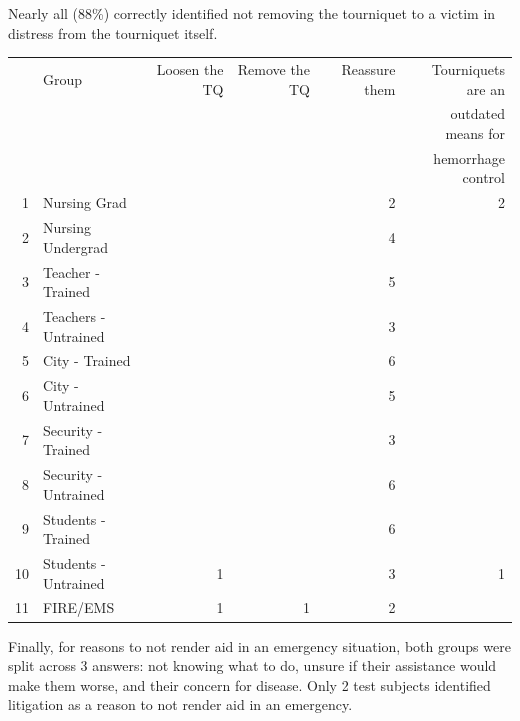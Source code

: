 \documentclass{article}
\begin{document}
Nearly all (88\%) correctly identified not removing the tourniquet to a victim in distress
from the tourniquet itself. 

\begin{table}[ht]
\centering
\begin{tabular}{rlrrrr}
  \hline
 & Group & Loosen the TQ & Remove the TQ & Reassure them & Tourniquets are an \\
 &  &  &  &  & outdated means for \\
 &  &  &  &  & hemorrhage control \\
  \hline
1 & Nursing Grad &  &  &   2 &   2 \\
  2 & Nursing Undergrad &  &  &   4 &  \\
  3 & Teacher - Trained &  &  &   5 &  \\
  4 & Teachers - Untrained &  &  &   3 &  \\
  5 & City - Trained &  &  &   6 &  \\
  6 & City - Untrained &  &  &   5 &  \\
  7 & Security - Trained &  &  &   3 &  \\
  8 & Security - Untrained &  &  &   6 &  \\
  9 & Students - Trained &  &  &   6 &  \\
  10 & Students - Untrained &   1 &  &   3 &   1 \\
  11 & FIRE/EMS &   1 &   1 &   2 &  \\
   \hline
\end{tabular}
\end{table}

\pagebreak
Finally, for reasons to not render aid in an emergency situation, both groups were split
across 3 answers: not knowing what to do, unsure if their assistance would make them worse, and
their concern for disease. Only 2 test subjects identified litigation as a reason to not render 
aid in an emergency. \\
\end{document}
